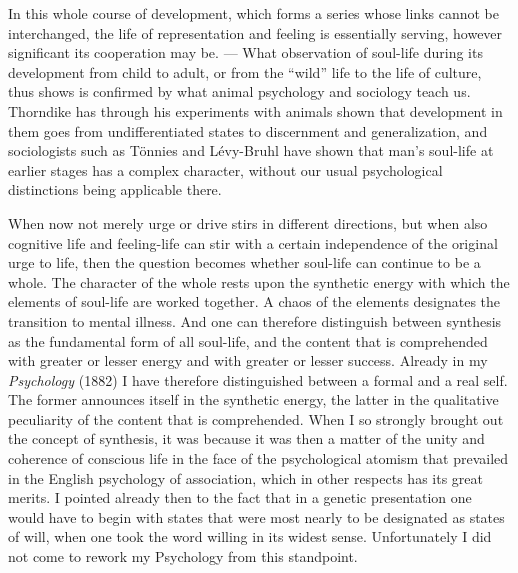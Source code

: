 \documentclass[12pt]{book}
\newcommand{\opage}[1]{\marginnote{\footnotesize\textit{[#1]}}}
\begin{document}
In this whole course of development, which forms a series whose links cannot be interchanged, the
life of representation and feeling is essentially serving, however significant its cooperation may
be. --- What observation of soul-life during its development from child to adult, or from the
``wild'' life to the life of culture, thus shows is confirmed by what animal psychology and
sociology teach us. Thorndike has through his experiments with animals shown that development in
them goes from undifferentiated states to discernment and generalization, and sociologists such as
Tönnies and Lévy-Bruhl have shown that man's soul-life at earlier stages has a complex character,
without our usual psychological distinctions being applicable there.

When now not merely urge or drive stirs in different directions, but when also cognitive life and
feeling-life can stir with a certain independence of the original urge to life, then the question
becomes whether soul-life can continue to be a whole. The character of the whole rests upon the
synthetic energy with which the elements of soul-life are worked together. A chaos of the elements
\opage{36}designates the transition to mental illness. And one can therefore distinguish between synthesis as
the fundamental form of all soul-life, and the content that is comprehended with greater or lesser
energy and with greater or lesser success. Already in my \textit{Psychology} (1882) I have therefore
distinguished between a formal and a real self. The former announces itself in the synthetic energy,
the latter in the qualitative peculiarity of the content that is comprehended. When I so strongly
brought out the concept of synthesis, it was because it was then a matter of the unity and coherence
of conscious life in the face of the psychological atomism that prevailed in the English
psychology of association, which in other respects has its great merits. I pointed already then to
the fact that in a genetic presentation one would have to begin with states that were most nearly to
be designated as states of will, when one took the word willing in its widest sense. Unfortunately I
did not come to rework my Psychology from this standpoint.
\end{document}
